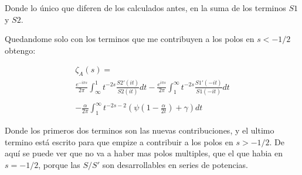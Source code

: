 Donde lo único que diferen de los calculados antes, en la suma de los terminos $S1$ y $S2$.

Quedandome solo con los terminos que me contribuyen a los polos en  $s < -1/2$ obtengo:

\begin{equation}
\begin{array}{c}
 \zeta _A (s) = \\
\frac{e ^{- i \pi s}}{2 \pi}
\int _{\infty} ^{1} t ^{-2s } 
		\frac{S2' (it)}{S2 (it)}
		d t
	- 
\frac{e ^{i \pi s}}{2 \pi}
\int _{1} ^{\infty} t ^{-2s } 
	\frac{S1' (-it)}{S1(-it)}
	d t
	 \\ \\
	- \frac{\alpha}{2 \pi }	 \int _1 ^{\infty}
	t ^{-2s-2} \left( \psi \left( 1 - \frac{\alpha}{2 t}\right) + \gamma \right) dt


\end{array}
\end{equation}

\begin{comment}
\begin{equation}
\frac{1 }{2 \pi i}
\int _{circulo} \lambda ^{-2s } \partial \lambda \ Log \left[
					\frac{e ^{\frac{i \alpha Log( 2 \lambda L )}{2 \lambda}} e ^{2 i \lambda L} S1}
					{\Gamma \left( 1 - \frac{i \alpha}{2 \lambda} \right)} - 
					\frac{e ^{\frac{-i \alpha Log(2 \lambda L )}{2 \lambda}} S2}
					{\Gamma \left( 1 + \frac{i \alpha}{2 \lambda} \right)}					
					\right] d \lambda
\end{equation}
\end{comment}

Donde los primeros dos terminos son las nuevas contribuciones, y el ultimo termino está escrito para que empize a contribuir a los polos en  $s > -1/2$. De aquí se puede ver que no va a haber mas polos multiples, que el que habia en $s=-1/2$, porque las $S / S' $ son desarrollables en series de potencias.


